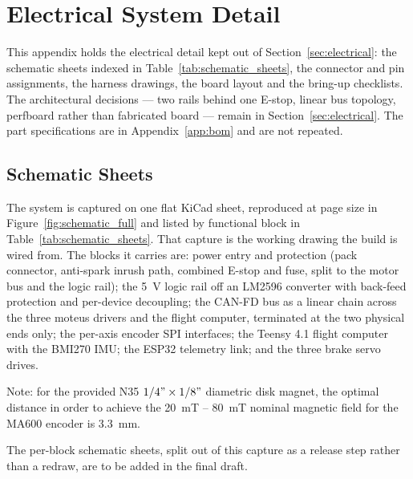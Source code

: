 \section{Electrical System Detail}
\label{app:electrical}

This appendix holds the electrical detail kept out of
Section~\ref{sec:electrical}: the schematic sheets indexed in
Table~\ref{tab:schematic_sheets}, the connector and pin assignments, the harness
drawings, the board layout and the bring-up checklists. The architectural
decisions --- two rails behind one E-stop, linear bus topology, perfboard rather
than fabricated board --- remain in Section~\ref{sec:electrical}. The part
specifications are in Appendix~\ref{app:bom} and are not repeated.

\subsection{Schematic Sheets}
\label{app:schematics}
\label{app:schematic_full}

The system is captured on one flat KiCad sheet, reproduced at page size in
Figure~\ref{fig:schematic_full} and listed by functional block in
Table~\ref{tab:schematic_sheets}. That capture is the working drawing the build
is wired from. The blocks it carries are: power entry and protection (pack
connector, anti-spark inrush path, combined E-stop and fuse, split to the motor
bus and the logic rail); the \qty{5}{\volt} logic rail off an LM2596 converter
with back-feed protection and per-device decoupling; the CAN-FD bus as a linear
chain across the three moteus drivers and the flight computer, terminated at
the two physical ends only; the per-axis encoder SPI interfaces; the Teensy 4.1
flight computer with the BMI270 IMU; the ESP32 telemetry link; and the three
brake servo drives.

Note: for the provided N35 $1/4" \times 1/8"$ diametric disk magnet, the optimal
distance in order to achieve the \qty{20}{\milli\tesla} --
\qty{80}{\milli\tesla} nominal magnetic field for the MA600 encoder is
\qty{3.3}{\milli\metre}.

The per-block schematic sheets, split out of this capture as a release step
rather than a redraw, are to be added in the final draft.


